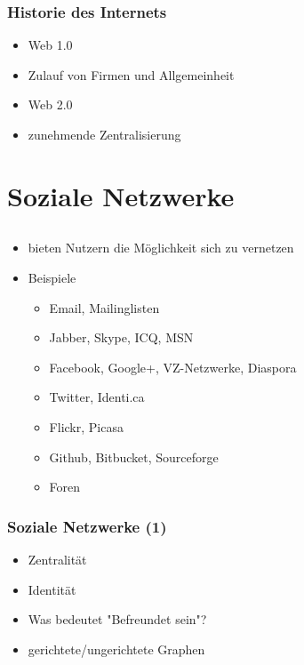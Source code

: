 \documentclass{beamer}
\begin{document}
\begin{frame}
  \frametitle{Historie des Internets}
  \begin{itemize}
    \item<2-> Web 1.0
    \item<3-> Zulauf von Firmen und Allgemeinheit
    \item<4-> Web 2.0
    \item<5-> zunehmende Zentralisierung
  \end{itemize}
\end{frame}

\section{Soziale Netzwerke}
\subsection{}

\begin{frame}
  \begin{itemize}
  \frametitle{Soziale Netzwerke}
    \item<2-> bieten Nutzern die Möglichkeit sich zu vernetzen
    \item<3-> Beispiele
      \begin{itemize}
        \item<3-> Email, Mailinglisten
        \item<3-> Jabber, Skype, ICQ, MSN
        \item<3-> Facebook, Google+, VZ-Netzwerke, Diaspora
        \item<3-> Twitter, Identi.ca
        \item<3-> Flickr, Picasa
        \item<3-> Github, Bitbucket, Sourceforge
        \item<3-> Foren
      \end{itemize}
  \end{itemize}
\end{frame}

\begin{frame}
  \frametitle{Soziale Netzwerke (1)}
  \begin{itemize}
    \item<2-> Zentralität
    \item<3-> Identität
    \item<4-> Was bedeutet "Befreundet sein"?
    \item<5-> gerichtete/ungerichtete Graphen
  \end{itemize}
\end{frame}
\end{document}

